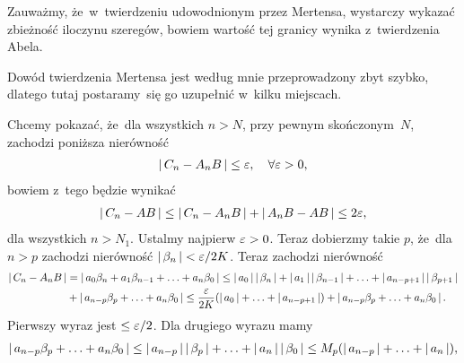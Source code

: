 \documentclass[a4paper,11pt]{article}
\begin{document}
\vspace{\spaceFour}


\start {} Zauważmy, że~w~twierdzeniu udowodnionym przez
Mertensa, wystarczy wykazać zbieżność iloczynu szeregów, bowiem
wartość tej granicy wynika z~twierdzenia Abela.

\vspace{\spaceFour}


\start {} Dowód twierdzenia Mertensa jest według mnie
przeprowadzony zbyt szybko, dlatego tutaj postaramy~się go uzupełnić
w~kilku miejscach.

Chcemy pokazać, że~dla wszystkich $n > N$, przy pewnym skończonym~$N$,
zachodzi poniższa nierówność
\begin{equation}
  \label{eq:9}
  \begin{split}
    \left| \,  C_{ n } - A_{ n } B  \, \right| \leq \varepsilon, \quad \forall \varepsilon > 0,
  \end{split}
\end{equation}
bowiem z~tego będzie wynikać
\begin{equation}
  \label{eq:10}
  \begin{split}
    \left| \,  C_{ n } - AB  \, \right| \leq \left| \,  C_{ n } - A_{ n } B  \, \right| + \left| \, 
      A_{ n } B - AB  \, \right| \leq 2\varepsilon,
  \end{split}
\end{equation}
dla wszystkich $n > N_{ 1 }$. Ustalmy najpierw $\varepsilon > 0$. Teraz
dobierzmy takie $p$, że~dla $n > p$ zachodzi nierówność
$\left| \,  \beta_{ n }  \, \right| < \varepsilon / 2K$. Teraz zachodzi nierówność
\begin{equation}
  \label{eq:11}
  \begin{split}
    \left| \,  C_{ n } - A_{ n } B  \, \right| &= \left| \,  a_{ 0 } \beta_{ n } + a_{ 1 }
      \beta_{ n - 1 } + \ldots + a_{ n } \beta_{ 0 }  \, \right| \leq \left| \,  a_{ 0 }  \, \right|
    \left| \,  \beta_{ n }  \, \right| + \left| \,  a_{ 1 }  \, \right| \left| \,  \beta_{ n - 1 }  \, \right| + \ldots
    + \left| \,  a_{ n - p + 1 }  \, \right|
    \left| \,  \beta_{ p + 1 }  \, \right| \\
    &+ \left| \,  a_{ n - p } \beta_{ p } + \ldots + a_{ n } \beta_{ 0 }  \, \right| \leq
    \frac{ \varepsilon }{ 2K } ( \left| \,  a_{ 0 }  \, \right| + \ldots + \left| \,  a_{ n - p + 1
      }  \, \right| ) + \left| \,  a_{ n - p } \beta_{ p } + \ldots + a_{ n } \beta_{ 0 }
     \, \right|.
  \end{split}
\end{equation}
Pierwszy wyraz jest $\leq \varepsilon / 2$. Dla drugiego wyrazu mamy
\begin{equation}
  \label{eq:12}
  \begin{split}
    \left| \,  a_{ n - p } \beta_{ p } + \ldots + a_{ n } \beta_{ 0 }  \, \right| \leq
    \left| \,  a_{ n - p }  \, \right| \left| \,  \beta_{ p }  \, \right| + \ldots + \left| \,  a_{ n }  \, \right|
    \left| \,  \beta_{ 0 }  \, \right| \leq M_{ p } ( \left| \,  a_{ n - p }  \, \right| + \ldots +
    \left| \,  a_{ n }  \, \right| ),
  \end{split}
\end{equation}
\end{document}

